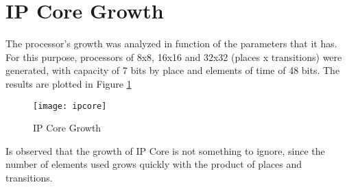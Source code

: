 \section{IP Core Growth}

	The processor's growth was analyzed in function of the parameters that it has. For this purpose, 
	processors of 8x8, 16x16 and 32x32 (places x transitions) were generated, with capacity of 7 bits 
	by place and elements of time of 48 bits. The results are plotted in Figure \ref{fig:growth}
	
	\begin{figure}[h]
			\centering
			\texttt{[image: ipcore]}
			\caption{IP Core Growth}
			\label{fig:growth}
	\end{figure}
	
	Is observed that the growth of IP Core is not something to ignore, since the number of elements 
	used grows quickly with the product of places and transitions.	 	